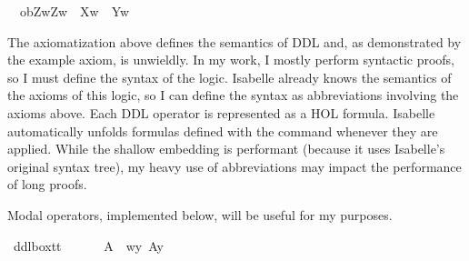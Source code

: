 \begin{isabellebody}
\ \ {\isasymlongrightarrow}ob{\isacharparenleft}Z{\isacharparenright}{\isacharparenleft}{\isasymlambda}w{\isachardot}{\isacharparenleft}Z{\isacharparenleft}w{\isacharparenright}\ {\isasymand}\ {\isasymnot}X{\isacharparenleft}w{\isacharparenright}{\isacharparenright}\ {\isasymor}\ Y{\isacharparenleft}w{\isacharparenright}{\isacharparenright}{\isachardoublequoteclose}\isanewline
%
%
\isadelimdocument
%
\endisadelimdocument
%
\isatagdocument
%
\isamarkuptrue%
%
\endisatagdocument
{\isafolddocument}%
%
\isadelimdocument
%
\endisadelimdocument
%
\begin{isamarkuptext}%
The axiomatization above defines the semantics of DDL and, as demonstrated by the example axiom,
is unwieldly. In my work, I mostly perform syntactic proofs, so I must define the syntax of the logic.
Isabelle already knows the semantics of the axioms of this logic, so I can define the syntax as abbreviations 
involving the axioms above. Each DDL operator is represented
as a HOL formula. Isabelle automatically unfolds formulas defined with the  command 
whenever they are applied. While the shallow embedding is performant (because it uses Isabelle's original 
syntax tree), my heavy use of abbreviations may impact the performance of long proofs.%
\end{isamarkuptext}\isamarkuptrue%
%
\begin{isamarkuptext}%
\noindent Modal operators, implemented below, will be useful for my purposes.%
\end{isamarkuptext}\isamarkuptrue%
\isamarkupfalse%
\ ddlbox{\isacharcolon}{\isacharcolon}{\isachardoublequoteopen}t{\isasymRightarrow}t{\isachardoublequoteclose}\ {\isacharparenleft}{\isachardoublequoteopen}{\isasymbox}{\isachardoublequoteclose}{\isacharparenright}\ \isanewline
\ \ \ {\isachardoublequoteopen}{\isasymbox}\ A\ {\isasymequiv}\ {\isasymlambda}w{\isachardot}{\isasymforall}y{\isachardot}\ A{\isacharparenleft}y{\isacharparenright}{\isachardoublequoteclose}\ \isanewline
%
\end{isabellebody}
